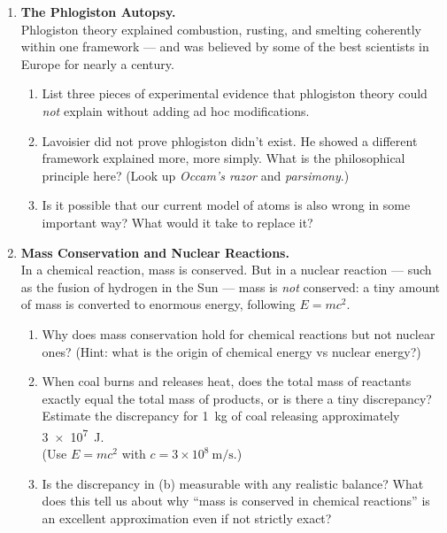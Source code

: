 \documentclass[12pt, a4paper]{book}
\theoremstyle{definition}
\begin{document}
\begin{deepbox}
\begin{enumerate}[label=\textbf{D\arabic*.}]

  \item \textbf{The Phlogiston Autopsy.}\\
        Phlogiston theory explained combustion, rusting, and
        smelting coherently within one framework —
        and was believed by some of the best scientists in Europe
        for nearly a century.

        \begin{enumerate}[label=(\alph*)]
          \item List three pieces of experimental evidence
                that phlogiston theory could \emph{not} explain
                without adding ad hoc modifications.
          \item Lavoisier did not prove phlogiston didn't exist.
                He showed a different framework explained more,
                more simply.
                What is the philosophical principle here?
                (Look up \emph{Occam's razor} and \emph{parsimony}.)
          \item Is it possible that our current model of atoms
                is also wrong in some important way?
                What would it take to replace it?
        \end{enumerate}

  \item \textbf{Mass Conservation and Nuclear Reactions.}\\
        In a chemical reaction, mass is conserved.
        But in a nuclear reaction — such as the fusion of hydrogen
        in the Sun — mass is \emph{not} conserved: a tiny amount
        of mass is converted to enormous energy, following
        $E = mc^2$.

        \begin{enumerate}[label=(\alph*)]
          \item Why does mass conservation hold for chemical reactions
                but not nuclear ones?
                (Hint: what is the origin of chemical energy
                vs nuclear energy?)
          \item When coal burns and releases heat,
                does the total mass of reactants exactly equal
                the total mass of products, or is there a tiny discrepancy?
                Estimate the discrepancy for \SI{1}{\kilo\gram} of coal
                releasing approximately \SI{3e7}{\joule}.\\
                (Use $E = mc^2$ with $c = 3\times10^8\ \si{\metre\per\second}$.)
          \item Is the discrepancy in (b) measurable with any
                realistic balance?
                What does this tell us about why
                ``mass is conserved in chemical reactions''
                is an excellent approximation even if
                not strictly exact?
        \end{enumerate}


\end{enumerate}
\end{deepbox}
\end{document}
